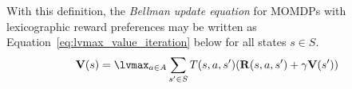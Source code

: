 With this definition, the \emph{Bellman update equation} for MOMDPs with lexicographic reward preferences may be written as Equation~\ref{eq:lvmax_value_iteration} below for all states $s \in S$.
\begin{equation}
    \label{eq:lvmax_value_iteration}
    \mathbf{V}(s) = \lvmax_{a \in A} \sum_{s' \in S} T(s, a, s') (\mathbf{R}(s, a, s') + \gamma \mathbf{V}(s'))
\end{equation}
